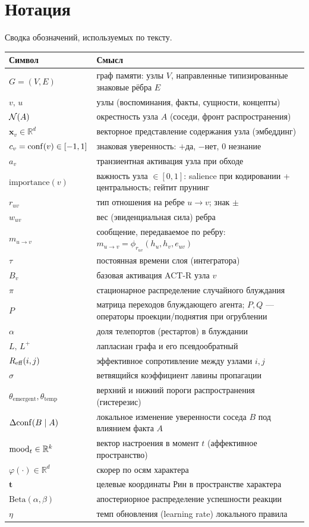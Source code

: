 \chapter{Нотация}
\label{ch:notation}

Сводка обозначений, используемых по тексту.

\begin{longtable}{p{} p{}}
\toprule
\textbf{Символ} & \textbf{Смысл} \\
\midrule
\endhead
$G=(V,E)$ & граф памяти: узлы $V$, направленные типизированные знаковые рёбра $E$ \\
$v,\,u$ & узлы (воспоминания, факты, сущности, концепты) \\
$\mathcal{N}(A)$ & окрестность узла $A$ (соседи, фронт распространения) \\
$\mathbf{x}_v\in\mathbb{R}^d$ & векторное представление содержания узла (эмбеддинг) \\
$c_v=\mathrm{conf}(v)\in[-1,1]$ & знаковая уверенность: $+$да, $-$нет, $0$ незнание \\
$a_v$ & транзиентная активация узла при обходе \\
$\text{importance}(v)$ & важность узла $\in[0,1]$: salience при кодировании + центральность; гейтит прунинг \\
$r_{uv}$ & тип отношения на ребре $u\to v$; знак $\pm$ \\
$w_{uv}$ & вес (эвиденциальная сила) ребра \\
$m_{u\to v}$ & сообщение, передаваемое по ребру: $m_{u\to v}=\phi_{r_{uv}}(h_u,h_v,e_{uv})$ \\
$\tau$ & постоянная времени слоя (интегратора) \\
$B_v$ & базовая активация ACT-R узла $v$ \\
$\pi$ & стационарное распределение случайного блуждания \\
$P$ & матрица переходов блуждающего агента; $P,Q$ — операторы проекции/поднятия при огрублении \\
$\alpha$ & доля телепортов (рестартов) в блуждании \\
$L,\,L^{+}$ & лапласиан графа и его псевдообратный \\
$R_{\mathrm{eff}}(i,j)$ & эффективное сопротивление между узлами $i,j$ \\
$\sigma$ & ветвящийся коэффициент лавины пропагации \\
$\theta_{\text{emergent}},\theta_{\text{temp}}$ & верхний и нижний пороги распространения (гистерезис) \\
$\Delta\mathrm{conf}(B\mid A)$ & локальное изменение уверенности соседа $B$ под влиянием факта $A$ \\
$\mathrm{mood}_t\in\mathbb{R}^k$ & вектор настроения в момент $t$ (аффективное пространство) \\
$\varphi(\cdot)\in\mathbb{R}^{d}$ & скорер по осям характера \\
$\mathbf{t}$ & целевые координаты Рин в пространстве характера \\
$\mathrm{Beta}(\alpha,\beta)$ & апостериорное распределение успешности реакции \\
$\eta$ & темп обновления (learning rate) локального правила \\
\bottomrule
\end{longtable}
